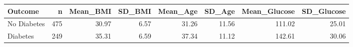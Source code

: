 \begin{table}[ht]
\centering
\begin{tabular}{lrrrrrrr}
  \hline
Outcome & n & Mean\_BMI & SD\_BMI & Mean\_Age & SD\_Age & Mean\_Glucose & SD\_Glucose \\ 
  \hline
No Diabetes & 475 & 30.97 & 6.57 & 31.26 & 11.56 & 111.02 & 25.01 \\ 
  Diabetes & 249 & 35.31 & 6.59 & 37.34 & 11.12 & 142.61 & 30.06 \\ 
   \hline
\end{tabular}
\end{table}
